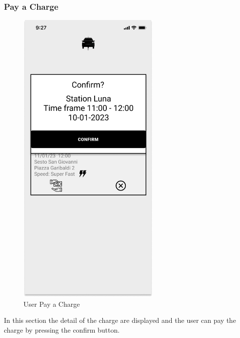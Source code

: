 \subsubsection{Pay a Charge}
\begin{figure}[H]
    \centering
    \includegraphics[keepaspectratio, height=15cm]{Mockup/UserAppInterface/Pay Charge.png}
    \caption{User Pay a Charge}
    \label{pop:Pay}
\end{figure}
In this section the detail of the charge are displayed and the user can pay the charge by pressing the confirm button.
